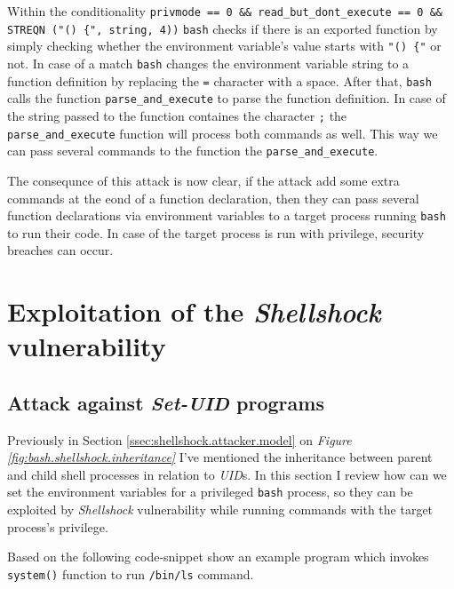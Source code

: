 \documentclass[12pt,a4paper,twocolumn]{article}
\begin{document}
Within the conditionality \lstinline{privmode == 0 && read_but_dont_execute == 0 && STREQN ("() {", string, 4))} \lstinline{bash} checks if there is an exported 
function by simply checking whether the environment variable's value starts with \lstinline{"() {"} or not. In case of a match \lstinline{bash} changes the environment variable string to a function definition by replacing the \lstinline{=} character with a space.\cite{compseced3}
After that, \lstinline{bash} calls the function \lstinline{parse_and_execute} to parse the function definition. In case of the string passed to the function containes the character \lstinline{;} the \lstinline{parse_and_execute} function will process both commands as well. This way we can pass several commands to the function the \lstinline{parse_and_execute}. 

The consequnce of this attack is now clear, if the attack add some extra commands at the eond of a function declaration, then they can pass several function declarations via environment variables to a target process running \lstinline{bash} to run their code. In case of the target process is run with privilege, security breaches can occur. \cite{compseced3}


\section{Exploitation of the \textit{Shellshock} vulnerability}
\label{sec:shellshock.exploit}
%

\subsection{Attack against \textit{Set-UID} programs}
\label{ssec:shellshock.attack.setuid}

Previously in Section \ref{ssec:shellshock.attacker.model} on \textit{Figure \ref{fig:bash.shellshock.inheritance}}  I've mentioned the inheritance between parent and child shell processes in relation  to \textit{UID}s. In this section I review how can we set the environment variables for a privileged \lstinline{bash} process, so they can be exploited by \textit{Shellshock} vulnerability while running commands with the target process's privilege. \cite{compseced3}

Based on \cite{compseced3} the following code-snippet show an example program which invokes \lstinline{system()}\cite{bin.system} function to run \lstinline{/bin/ls} \cite{bin.ls} command.
\end{document}
